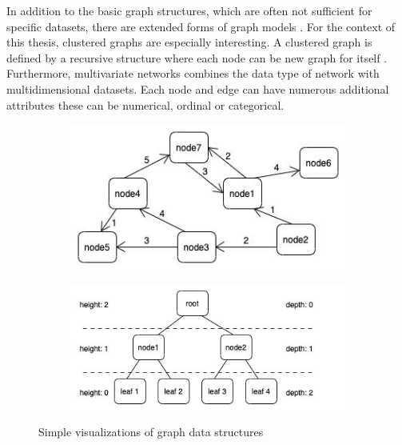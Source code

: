 In addition to the basic graph structures, which are often not sufficient for specific datasets, there are extended forms of graph models \cite{bertault_algorithm_1999}. 
For the context of this thesis, clustered graphs are especially interesting. A clustered graph is defined by a recursive structure where each node can be new graph for itself \cite{eades_multilevel_1997}.\\ 
Furthermore, multivariate networks \cite{kerren_introduction_2014} combines the data type of network with multidimensional datasets. Each node and edge can have numerous additional attributes these can be numerical, ordinal or categorical.

\begin{figure}[h]
    \centering
    \begin{subfigure}[b]{0.45\columnwidth}
        \centering
        \includegraphics[width=\textwidth]{graphics/weightedDirectedNetwork.jpg}
        \label{fig:simple_weighted_directed_network}
    \end{subfigure}
    \begin{subfigure}[b]{0.54\columnwidth}
        \centering
        \includegraphics[width=\textwidth]{graphics/basicTree.jpg}
        \label{fig:simple_tree}
    \end{subfigure}
    
    \caption[Optional caption for the figure list (often used to abbreviate long captions)]{Simple visualizations of graph data structures} %
    \label{fig:intro} 
  \end{figure}

